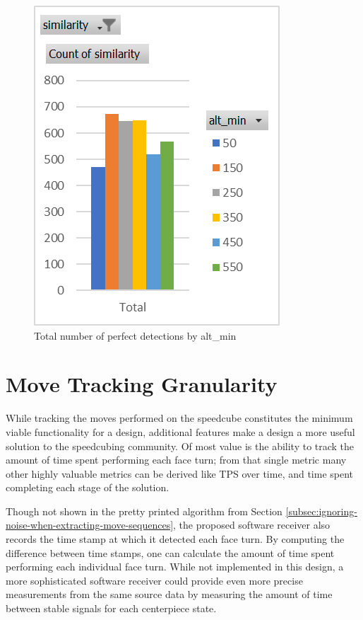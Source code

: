 \begin{figure}[h]
    \centering
    \caption{Total number of perfect detections by alt\_min}
    \label{fig:perfect-detections-by-alt-min}
    \includegraphics[width=0.75\linewidth]{Figures/7 Evaluation/perfect_detections_by_alt_min.png}
\end{figure}



\section{Move Tracking Granularity}
\label{sec:move-tracking-granularity}

While tracking the moves performed on the speedcube constitutes the
minimum viable functionality for a design, additional features make a
design a more useful solution to the speedcubing community. Of most
value is the ability to track the amount of time spent performing each
face turn; from that single metric many other highly valuable metrics
can be derived like TPS over time, and time spent completing each stage
of the solution.

Though not shown in the pretty printed algorithm from Section
\ref{subsec:ignoring-noise-when-extracting-move-sequences}, the
proposed software receiver also records the time stamp at which it
detected each face turn. By computing the difference between time
stamps, one can calculate the amount of time spent performing each
individual face turn. While not implemented in this design, a more
sophisticated software receiver could provide even more precise
measurements from the same source data by measuring the amount of time
between stable signals for each centerpiece state.

